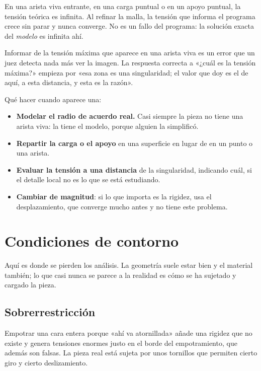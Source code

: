 En una arista viva entrante, en una carga puntual o en un apoyo puntual, la
tensión teórica es infinita. Al refinar la malla, la tensión que informa el
programa crece sin parar y nunca converge. No es un fallo del programa: la
solución exacta del \emph{modelo} es infinita ahí.

\begin{ojo}
Informar de la tensión máxima que aparece en una arista viva es un error que un
juez detecta nada más ver la imagen. La respuesta correcta a «¿cuál es la tensión
máxima?» empieza por «esa zona es una singularidad; el valor que doy es el de
aquí, a esta distancia, y esta es la razón».
\end{ojo}

Qué hacer cuando aparece una:

\begin{itemize}
  \item \textbf{Modelar el radio de acuerdo real.} Casi siempre la pieza no tiene
        una arista viva: la tiene el modelo, porque alguien la simplificó.
  \item \textbf{Repartir la carga o el apoyo} en una superficie en lugar de en un
        punto o una arista.
  \item \textbf{Evaluar la tensión a una distancia} de la singularidad, indicando
        cuál, si el detalle local no es lo que se está estudiando.
  \item \textbf{Cambiar de magnitud}: si lo que importa es la rigidez, usa el
        desplazamiento, que converge mucho antes y no tiene este problema.
\end{itemize}

\section{Condiciones de contorno}
\label{sec:elementos_finitos:03}

Aquí es donde se pierden los análisis. La geometría suele estar bien y el
material también; lo que casi nunca se parece a la realidad es cómo se ha sujetado
y cargado la pieza.

\subsection{Sobrerrestricción}

Empotrar una cara entera porque «ahí va atornillada» añade una rigidez que no
existe y genera tensiones enormes justo en el borde del empotramiento, que además
son falsas. La pieza real está sujeta por unos tornillos que permiten cierto giro
y cierto deslizamiento.

